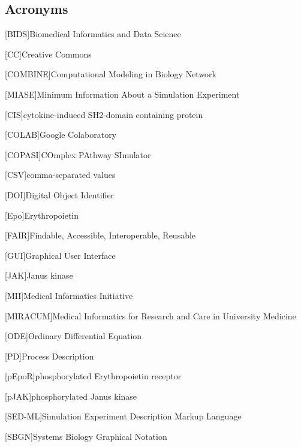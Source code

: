 \subsection*{Acronyms}
    \begin{acronym}[acrmeta]
        
        [BIDS]{Biomedical Informatics and Data Science}
       
       [CC]{Creative Commons}
       
       
        [COMBINE]{Computational Modeling in Biology Network}
        
        [MIASE]{Minimum Information About a Simulation Experiment}
        
        [CIS]{cytokine-induced SH2-domain containing protein}
        
        [COLAB]{Google Colaboratory}
        
        [COPASI]{COmplex PAthway SImulator}
        
        [CSV]{comma-separated values}
        
        [DOI]{Digital Object Identifier}
        
        [Epo]{Erythropoietin}
        
        [FAIR]{Findable, Accessible, Interoperable, Reusable}
        
        [GUI]{Graphical User Interface}
        
        [JAK]{Janus kinase}
        
        [MII]{Medical Informatics Initiative}
        
        [MIRACUM]{Medical Informatics for Research and Care in University
Medicine}

        [ODE]{Ordinary Differential Equation}

        [PD]{Process Description}
        
        [pEpoR]{phosphorylated Erythropoietin receptor}
        
        [pJAK]{phosphorylated Janus kinase}
        
        [SED-ML]{Simulation Experiment Description Markup Language}
        
        [SBGN]{Systems Biology Graphical Notation}
        

\end{acronym}
